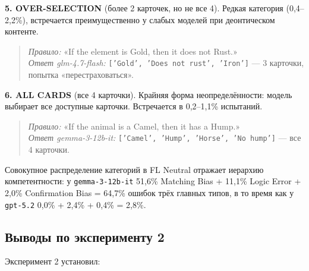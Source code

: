 \textbf{5. OVER-SELECTION} (более 2 карточек, но не все 4). Редкая категория (0,4--2,2\%), встречается преимущественно у слабых моделей при деонтическом контенте.

\begin{quote}
\textit{Правило:} «If the element is Gold, then it does not Rust.»\\
\textit{Ответ glm-4.7-flash:} \texttt{['Gold', 'Does not rust', 'Iron']} --- 3 карточки, попытка «перестраховаться».
\end{quote}

\textbf{6. ALL CARDS} (все 4 карточки). Крайняя форма неопределённости: модель выбирает все доступные карточки. Встречается в 0,2--1,1\% испытаний.

\begin{quote}
\textit{Правило:} «If the animal is a Camel, then it has a Hump.»\\
\textit{Ответ gemma-3-12b-it:} \texttt{['Camel', 'Hump', 'Horse', 'No hump']} --- все 4 карточки.
\end{quote}

Совокупное распределение категорий в FL Neutral отражает иерархию компетентности: у \texttt{gemma-3-12b-it} 51,6\% Matching Bias + 11,1\% Logic Error + 2,0\% Confirmation Bias = 64,7\% ошибок трёх главных типов, в то время как у \texttt{gpt-5.2} 0,0\% + 2,4\% + 0,4\% = 2,8\%.

\subsection{Выводы по эксперименту 2}

Эксперимент 2 установил:

